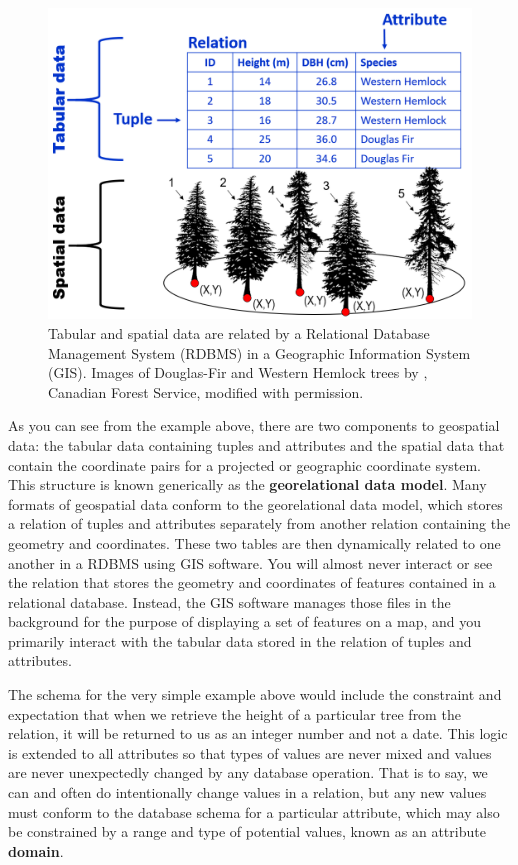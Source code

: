 \documentclass[
]{book}
\begin{document}
\begin{figure}
\includegraphics[width=0.75\linewidth]{images/05-tabular-data-spatial-data} \caption{Tabular and spatial data are related by a Relational Database Management System (RDBMS) in a Geographic Information System (GIS). Images of Douglas-Fir and Western Hemlock trees by \citep{canadian_forest_service_douglas-fir_2013}, Canadian Forest Service, modified with permission.}\label{fig:5-tabular-data-spatial-data}
\end{figure}

As you can see from the example above, there are two components to geospatial data: the tabular data containing tuples and attributes and the spatial data that contain the coordinate pairs for a projected or geographic coordinate system. This structure is known generically as the \textbf{georelational data model}. Many formats of geospatial data conform to the georelational data model, which stores a relation of tuples and attributes separately from another relation containing the geometry and coordinates. These two tables are then dynamically related to one another in a RDBMS using GIS software. You will almost never interact or see the relation that stores the geometry and coordinates of features contained in a relational database. Instead, the GIS software manages those files in the background for the purpose of displaying a set of features on a map, and you primarily interact with the tabular data stored in the relation of tuples and attributes.

The schema for the very simple example above would include the constraint and expectation that when we retrieve the height of a particular tree from the relation, it will be returned to us as an integer number and not a date. This logic is extended to all attributes so that types of values are never mixed and values are never unexpectedly changed by any database operation. That is to say, we can and often do intentionally change values in a relation, but any new values must conform to the database schema for a particular attribute, which may also be constrained by a range and type of potential values, known as an attribute \textbf{domain}.
\end{document}
